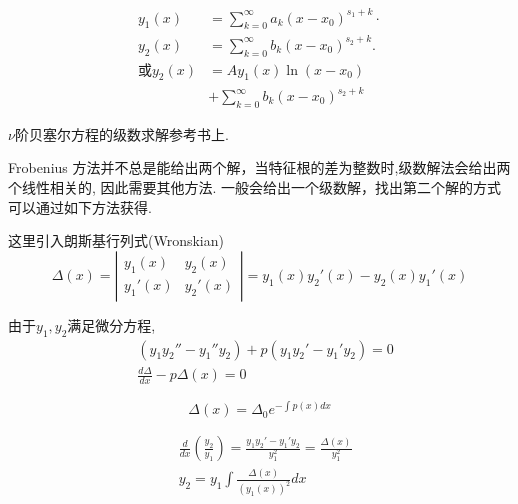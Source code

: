 $$
\begin{aligned}
y_1(x) & =\sum_{k=0}^{\infty} a_k\left(x-x_0\right)^{s_1+k} \cdot \\
y_2(x) & =\sum_{k=0}^{\infty} b_k\left(x-x_0\right)^{s_2+k} . \\
\text{或} y_2(x) & =A y_1(x) \ln \left(x-x_0\right) \\
& +\sum_{k=0}^{\infty} b_k\left(x-x_0\right)^{s_2+k}
\end{aligned}
$$


$\nu$阶贝塞尔方程的级数求解参考书上.




Frobenius 方法并不总是能给出两个解，当特征根的差为整数时,级数解法会给出两个线性相关的, 因此需要其他方法.
一般会给出一个级数解，找出第二个解的方式可以通过如下方法获得.

这里引入朗斯基行列式(Wronskian)
$$
\Delta(x)=\left|\begin{array}{ll}
y_1(x) & y_2(x) \\
y_1'(x) & y_2'(x)
\end{array}\right|= y_1(x) y_2'(x) - y_2(x) y_1'(x)
$$

由于$y_1, y_2$满足微分方程,
$$
\begin{aligned}
& \left(y_1 y_2''-y_1'' 
y_2\right)+p\left(y_1 y_2'-y_1' y_2\right) = 0\\
& \frac{d \Delta}{d x} - p \Delta(x)=0
\end{aligned}
$$

$$
\Delta(x)=\Delta_0 e^{-\int p(x) d x}
$$

$$
\begin{aligned}
& \frac{d}{d x}\left(\frac{y_{2}}{y_1}\right)=\frac{y_{1} y_{2}'-y_{1}' y_{2}}{y_{1}^2}=\frac{\Delta(x)}{y_{1}^2} \\
& y_{2}=y_{1} \int \frac{\Delta(x)}{\left(y_{1}(x)\right)^2} d x
\end{aligned}
$$

